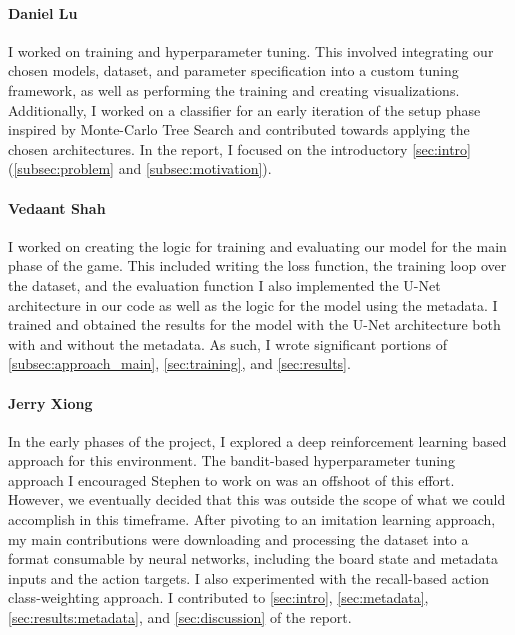 \documentclass[10pt,twocolumn,letterpaper]{article}
\begin{document}
\paragraph{Daniel Lu}

I worked on training and hyperparameter tuning. This involved
integrating our chosen models, dataset, and parameter
specification into a custom tuning framework, as well as
performing the training and creating visualizations.
Additionally, I worked on a classifier for an early iteration
of the setup phase inspired by Monte-Carlo Tree Search and
contributed towards applying the chosen architectures.
In the report, I focused on the introductory \autoref{sec:intro}
(\autoref{subsec:problem} and \autoref{subsec:motivation}).

\paragraph{Vedaant Shah}

I worked on creating the logic for training and
evaluating our model for the main phase of the game.
This included writing the loss function, the training
loop over the dataset, and the evaluation function
I also implemented the U-Net architecture in our code
as well as the logic for the model using the metadata.
I trained and obtained the results for the model with the
U-Net architecture both with and without the metadata.
As such, I wrote significant portions of \autoref{subsec:approach_main},
\autoref{sec:training}, and \autoref{sec:results}.

\paragraph{Jerry Xiong}

In the early phases of the project, I explored a deep
reinforcement learning based approach for this environment.
The bandit-based hyperparameter tuning approach I encouraged
Stephen to work on was an offshoot of this effort.
However, we eventually decided that this was outside the
scope of what we could accomplish in this timeframe.
After pivoting to an imitation learning approach, my main contributions were
downloading and processing the dataset into a format consumable by neural
networks, including the board state and metadata inputs and the action targets.
I also experimented with the recall-based action class-weighting approach.
I contributed to \autoref{sec:intro}, \autoref{sec:metadata},
\autoref{sec:results:metadata}, and \autoref{sec:discussion} of the report.
\end{document}
